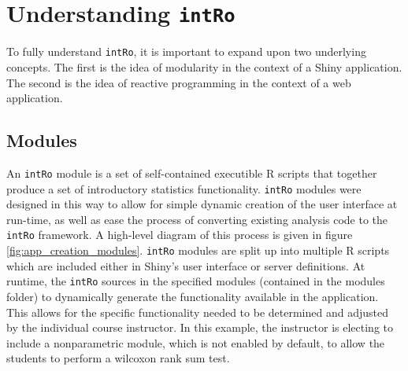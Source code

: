\documentclass[12pt,]{article}
\begin{document}
\section{\texorpdfstring{Understanding
\texttt{intRo}}{Understanding intRo}}\label{understanding-intro}

To fully understand \texttt{intRo}, it is important to expand upon two
underlying concepts. The first is the idea of modularity in the context
of a Shiny application. The second is the idea of reactive programming
in the context of a web application.

\subsection{Modules}\label{modules}

An \texttt{intRo} module is a set of self-contained executible R scripts
that together produce a set of introductory statistics functionality.
\texttt{intRo} modules were designed in this way to allow for simple
dynamic creation of the user interface at run-time, as well as ease the
process of converting existing analysis code to the \texttt{intRo}
framework. A high-level diagram of this process is given in figure
\ref{fig:app_creation_modules}. \texttt{intRo} modules are split up into
multiple R scripts which are included either in Shiny's user interface
or server definitions. At runtime, the \texttt{intRo} sources in the
specified modules (contained in the modules folder) to dynamically
generate the functionality available in the application. This allows for
the specific functionality needed to be determined and adjusted by the
individual course instructor. In this example, the instructor is
electing to include a nonparametric module, which is not enabled by
default, to allow the students to perform a wilcoxon rank sum test.
\end{document}
